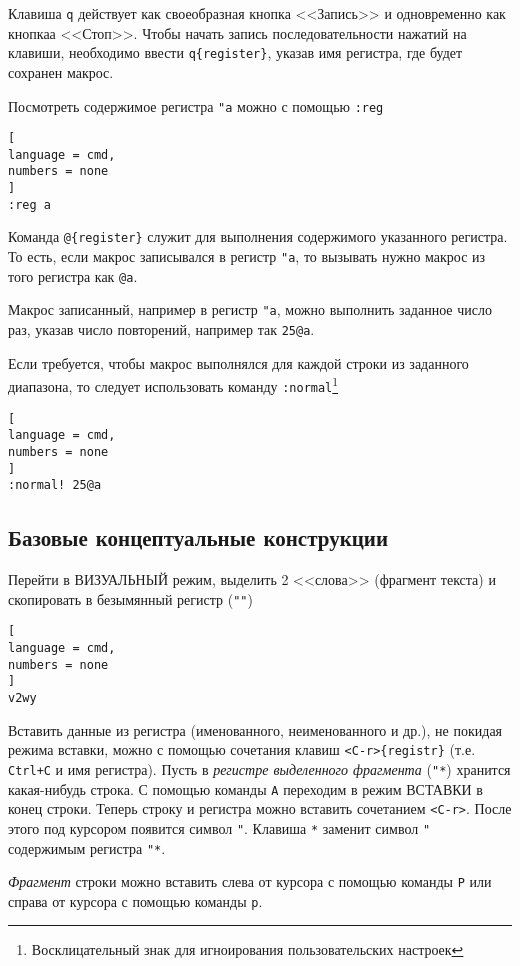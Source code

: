 \documentclass[%
	11pt,
	a4paper,
	utf8,
		]{article}
\begin{document}
Клавиша \texttt{q} действует как своеобразная кнопка <<Запись>> и одновременно как кнопкаа <<Стоп>>. Чтобы начать запись последовательности нажатий на клавиши, необходимо ввести \verb|q{register}|, указав имя регистра, где будет сохранен макрос. 

Посмотреть содержимое регистра \verb|"a| можно с помощью \texttt{:reg}
\begin{lstlisting}[
language = cmd,
numbers = none
]
:reg a
\end{lstlisting}

Команда \verb|@{register}| служит для выполнения содержимого указанного регистра. То есть, если макрос записывался в регистр \verb|"a|, то вызывать нужно макрос из того регистра как \verb|@a|.

Макрос записанный, например в регистр \texttt{"a}, можно выполнить заданное число раз, указав число повторений, например так \verb|25@a|.

Если требуется, чтобы макрос выполнялся для каждой строки из заданного диапазона, то следует использовать команду \texttt{:normal}\footnote{Восклицательный знак для игноирования пользовательских настроек}
\begin{lstlisting}[
language = cmd,
numbers = none
]
:normal! 25@a
\end{lstlisting}



\subsection{Базовые концептуальные конструкции}

Перейти в ВИЗУАЛЬНЫЙ режим, выделить 2 <<слова>> (фрагмент текста) и скопировать в безымянный регистр (\verb|""|)
\begin{lstlisting}[
language = cmd,
numbers = none
]
v2wy
\end{lstlisting}

Вставить данные из регистра (именованного, неименованного и др.), не покидая режима вставки, можно с помощью сочетания клавиш \verb|<C-r>{registr}| (т.е. \texttt{Ctrl+C} и имя регистра). Пусть в \emph{регистре выделенного фрагмента} (\texttt{"*}) хранится какая-нибудь строка. С помощью команды \texttt{A} переходим в режим ВСТАВКИ в конец строки. Теперь строку и регистра можно вставить сочетанием \verb|<C-r>|. После этого под курсором появится символ \verb|"|. Клавиша \texttt{*} заменит символ \verb|"| содержимым регистра \verb|"*|.

\emph{Фрагмент} строки можно вставить слева от курсора с помощью команды \texttt{P} или справа от курсора с помощью команды \texttt{p}.
\end{document}
